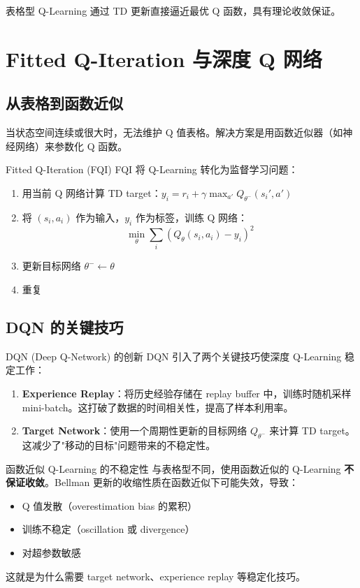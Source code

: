 \documentclass[a4paper]{article}
\begin{document}
表格型 Q-Learning 通过 TD 更新直接逼近最优 Q 函数，具有理论收敛保证。

\section{Fitted Q-Iteration 与深度 Q 网络}

\subsection{从表格到函数近似}

当状态空间连续或很大时，无法维护 Q 值表格。解决方案是用函数近似器（如神经网络）来参数化 Q 函数。

\begin{importantbox}{Fitted Q-Iteration (FQI)}
FQI 将 Q-Learning 转化为监督学习问题：
\begin{enumerate}
    \item 用当前 Q 网络计算 TD target：$y_i = r_i + \gamma \max_{a'} Q_{\theta^-}(s_i', a')$
    \item 将 $(s_i, a_i)$ 作为输入，$y_i$ 作为标签，训练 Q 网络：
    $$\min_\theta \sum_i \left(Q_\theta(s_i, a_i) - y_i\right)^2$$
    \item 更新目标网络 $\theta^- \leftarrow \theta$
    \item 重复
\end{enumerate}
\end{importantbox}

\subsection{DQN 的关键技巧}

\begin{importantbox}{DQN (Deep Q-Network) 的创新}
DQN 引入了两个关键技巧使深度 Q-Learning 稳定工作：
\begin{enumerate}
    \item \textbf{Experience Replay}：将历史经验存储在 replay buffer 中，训练时随机采样 mini-batch。这打破了数据的时间相关性，提高了样本利用率。
    \item \textbf{Target Network}：使用一个周期性更新的目标网络 $Q_{\theta^-}$ 来计算 TD target。这减少了"移动的目标"问题带来的不稳定性。
\end{enumerate}
\end{importantbox}

\begin{warningbox}{函数近似 Q-Learning 的不稳定性}
与表格型不同，使用函数近似的 Q-Learning \textbf{不保证收敛}。Bellman 更新的收缩性质在函数近似下可能失效，导致：
\begin{itemize}
    \item Q 值发散（overestimation bias 的累积）
    \item 训练不稳定（oscillation 或 divergence）
    \item 对超参数敏感
\end{itemize}
这就是为什么需要 target network、experience replay 等稳定化技巧。
\end{warningbox}
\end{document}
